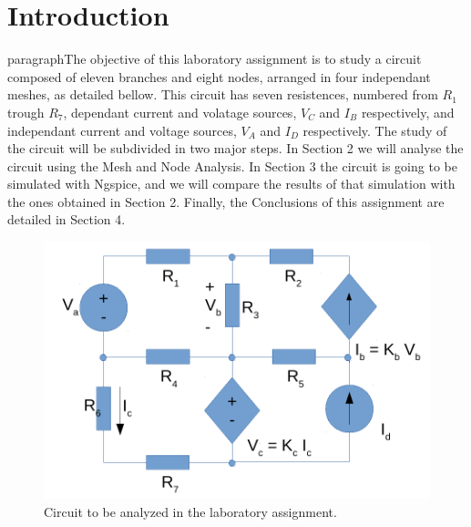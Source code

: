 \section{Introduction}
\label{sec:introduction}

paragraph{}The objective of this laboratory assignment is to study a circuit composed of eleven branches and eight nodes, arranged in four independant meshes,
 as detailed bellow. This circuit has seven resistences, numbered from $R_1$ trough $R_7$, dependant current and volatage sources, $V_C$ and $I_B$ respectively,
 and independant current and voltage sources, $V_A$ and $I_D$ respectively.
The study of the circuit will be subdivided in two major steps. In Section 2 we will analyse the circuit using the Mesh and Node Analysis. In Section 3 the circuit is going to be simulated
 with Ngspice, and we will compare the results of that simulation with the ones obtained in Section 2.
Finally, the Conclusions of this assignment are detailed in Section 4.

\begin{figure}[h] \centering
\includegraphics[width=0.4\linewidth]{circuit.pdf}
\caption{Circuit to be analyzed in the laboratory assignment.}
\label{fig:rc}
\end{figure}



